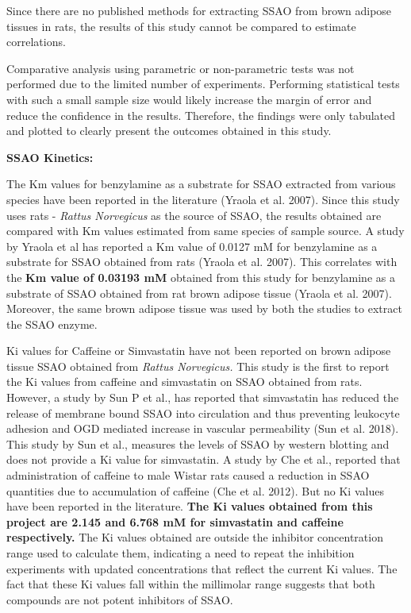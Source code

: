 \documentclass[
  letterpaper,
  DIV=11,
  numbers=noendperiod]{scrreprt}
\begin{document}
Since there are no published methods for extracting SSAO from brown
adipose tissues in rats, the results of this study cannot be compared to
estimate correlations.

Comparative analysis using parametric or non-parametric tests was not
performed due to the limited number of experiments. Performing
statistical tests with such a small sample size would likely increase
the margin of error and reduce the confidence in the results. Therefore,
the findings were only tabulated and plotted to clearly present the
outcomes obtained in this study.

\textbf{SSAO Kinetics:}

The Km values for benzylamine as a substrate for SSAO extracted from
various species have been reported in the literature (Yraola et al.
2007). Since this study uses rats - \emph{Rattus Norvegicus} as the
source of SSAO, the results obtained are compared with Km values
estimated from same species of sample source. A study by Yraola et al
has reported a Km value of 0.0127 mM for benzylamine as a substrate for
SSAO obtained from rats (Yraola et al. 2007). This correlates with the
\textbf{Km value of 0.03193 mM} obtained from this study for benzylamine
as a substrate of SSAO obtained from rat brown adipose tissue (Yraola et
al. 2007). Moreover, the same brown adipose tissue was used by both the
studies to extract the SSAO enzyme.

Ki values for Caffeine or Simvastatin have not been reported on brown
adipose tissue SSAO obtained from \emph{Rattus Norvegicus.} This study
is the first to report the Ki values from caffeine and simvastatin on
SSAO obtained from rats. However, a study by Sun P et al., has reported
that simvastatin has reduced the release of membrane bound SSAO into
circulation and thus preventing leukocyte adhesion and OGD mediated
increase in vascular permeability (Sun et al. 2018). This study by Sun
et al., measures the levels of SSAO by western blotting and does not
provide a Ki value for simvastatin. A study by Che et al., reported that
administration of caffeine to male Wistar rats caused a reduction in
SSAO quantities due to accumulation of caffeine (Che et al. 2012). But
no Ki values have been reported in the literature. \textbf{The Ki values
obtained from this project are 2.145 and 6.768 mM for simvastatin and
caffeine respectively.} The Ki values obtained are outside the inhibitor
concentration range used to calculate them, indicating a need to repeat
the inhibition experiments with updated concentrations that reflect the
current Ki values. The fact that these Ki values fall within the
millimolar range suggests that both compounds are not potent inhibitors
of SSAO.
\end{document}
